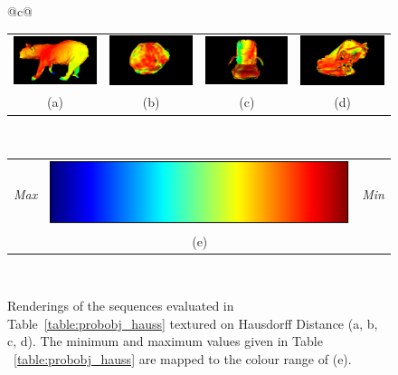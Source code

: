 \begin{figure}[!htbp]
  \centering
  \begin{tabular}{@{}c@{}}
    \begin{tabular}{cccc}
      \includegraphics[width=.2\linewidth]{figures/object_recon/hauss/bear.png}&
      \includegraphics[width=.2\linewidth]{figures/object_recon/hauss/brain.png}&
      \includegraphics[width=.2\linewidth]{figures/object_recon/hauss/chair.png}&
      \includegraphics[width=.2\linewidth]{figures/object_recon/hauss/dino.png} \\
      (a) & (b) & (c) & (d) \\
    \end{tabular} \\
    \begin{tabular}{ccc}
      \textit{Max} & 
      \includegraphics[width=.2\linewidth]{figures/object_recon/hauss/colour_range.png} & 
      \textit{Min} \\
      & (e) & \\
    \end{tabular}
  \end{tabular}
  \caption[Probabilistic Object Reconstruction Hausdorff Distance]
  {Renderings of the sequences evaluated in Table~\ref{table:probobj_hauss} textured 
  on Hausdorff Distance (a, b, c, d). The minimum and maximum values given in Table 
~\ref{table:probobj_hauss} are mapped to the colour range of (e).}
~\label{figure:probobj_hauss}
\end{figure}

